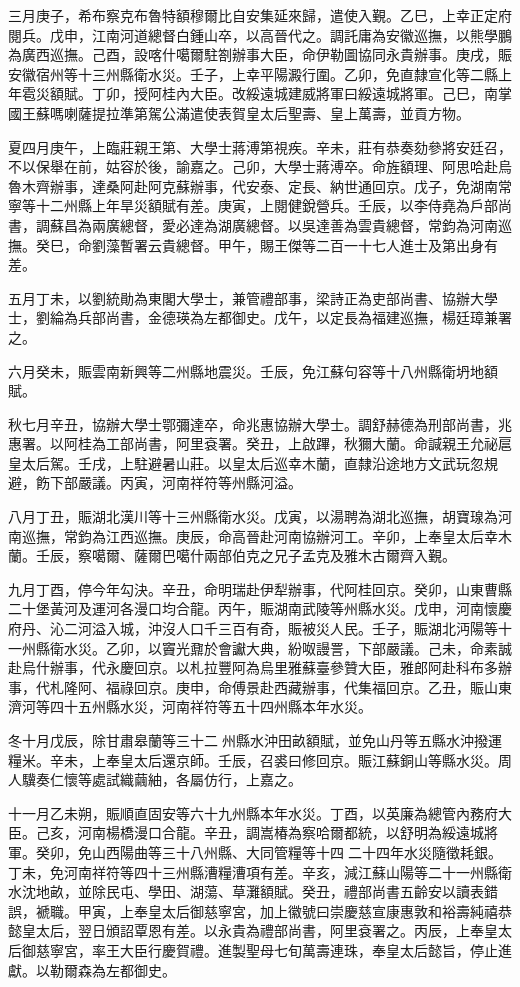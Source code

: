\begin{pinyinscope}
三月庚子，希布察克布魯特額穆爾比自安集延來歸，遣使入覲。乙巳，上幸正定府閱兵。戊申，江南河道總督白鍾山卒，以高晉代之。調託庸為安徽巡撫，以熊學鵬為廣西巡撫。己酉，設喀什噶爾駐劄辦事大臣，命伊勒圖協同永貴辦事。庚戌，賑安徽宿州等十三州縣衛水災。壬子，上幸平陽澱行圍。乙卯，免直隸宣化等二縣上年雹災額賦。丁卯，授阿桂內大臣。改綏遠城建威將軍曰綏遠城將軍。己巳，南掌國王蘇嗎喇薩提拉準第駕公滿遣使表賀皇太后聖壽、皇上萬壽，並貢方物。

夏四月庚午，上臨莊親王第、大學士蔣溥第視疾。辛未，莊有恭奏劾參將安廷召，不以保舉在前，姑容於後，諭嘉之。己卯，大學士蔣溥卒。命旌額理、阿思哈赴烏魯木齊辦事，達桑阿赴阿克蘇辦事，代安泰、定長、納世通回京。戊子，免湖南常寧等十二州縣上年旱災額賦有差。庚寅，上閱健銳營兵。壬辰，以李侍堯為戶部尚書，調蘇昌為兩廣總督，愛必達為湖廣總督。以吳達善為雲貴總督，常鈞為河南巡撫。癸巳，命劉藻暫署云貴總督。甲午，賜王傑等二百一十七人進士及第出身有差。

五月丁未，以劉統勛為東閣大學士，兼管禮部事，梁詩正為吏部尚書、協辦大學士，劉綸為兵部尚書，金德瑛為左都御史。戊午，以定長為福建巡撫，楊廷璋兼署之。

六月癸未，賑雲南新興等二州縣地震災。壬辰，免江蘇句容等十八州縣衛坍地額賦。

秋七月辛丑，協辦大學士鄂彌達卒，命兆惠協辦大學士。調舒赫德為刑部尚書，兆惠署。以阿桂為工部尚書，阿里袞署。癸丑，上啟蹕，秋獮大蘭。命諴親王允祕扈皇太后駕。壬戌，上駐避暑山莊。以皇太后巡幸木蘭，直隸沿途地方文武玩忽規避，飭下部嚴議。丙寅，河南祥符等州縣河溢。

八月丁丑，賑湖北漢川等十三州縣衛水災。戊寅，以湯聘為湖北巡撫，胡寶瑔為河南巡撫，常鈞為江西巡撫。庚辰，命高晉赴河南協辦河工。辛卯，上奉皇太后幸木蘭。壬辰，察噶爾、薩爾巴噶什兩部伯克之兄子孟克及雅木古爾齊入覲。

九月丁酉，停今年勾決。辛丑，命明瑞赴伊犁辦事，代阿桂回京。癸卯，山東曹縣二十堡黃河及運河各漫口均合龍。丙午，賑湖南武陵等州縣水災。戊申，河南懷慶府丹、沁二河溢入城，沖沒人口千三百有奇，賑被災人民。壬子，賑湖北沔陽等十一州縣衛水災。乙卯，以竇光鼐於會讞大典，紛呶謾詈，下部嚴議。己未，命素誠赴烏什辦事，代永慶回京。以札拉豐阿為烏里雅蘇臺參贊大臣，雅郎阿赴科布多辦事，代札隆阿、福祿回京。庚申，命傅景赴西藏辦事，代集福回京。乙丑，賑山東濟河等四十五州縣水災，河南祥符等五十四州縣本年水災。

冬十月戊辰，除甘肅皋蘭等三十二州縣水沖田畝額賦，並免山丹等五縣水沖撥運糧米。辛未，上奉皇太后還京師。壬辰，召裘曰修回京。賑江蘇銅山等縣水災。周人驥奏仁懷等處試織繭紬，各屬仿行，上嘉之。

十一月乙未朔，賑順直固安等六十九州縣本年水災。丁酉，以英廉為總管內務府大臣。己亥，河南楊橋漫口合龍。辛丑，調嵩椿為察哈爾都統，以舒明為綏遠城將軍。癸卯，免山西陽曲等三十八州縣、大同管糧等十四二十四年水災隨徵耗銀。丁未，免河南祥符等四十三州縣漕糧漕項有差。辛亥，減江蘇山陽等二十一州縣衛水沈地畝，並除民屯、學田、湖蕩、草灘額賦。癸丑，禮部尚書五齡安以讀表錯誤，褫職。甲寅，上奉皇太后御慈寧宮，加上徽號曰崇慶慈宣康惠敦和裕壽純禧恭懿皇太后，翌日頒詔覃恩有差。以永貴為禮部尚書，阿里袞署之。丙辰，上奉皇太后御慈寧宮，率王大臣行慶賀禮。進製聖母七旬萬壽連珠，奉皇太后懿旨，停止進獻。以勒爾森為左都御史。


\end{pinyinscope}
